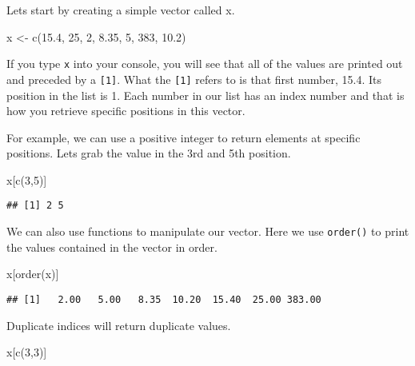 \documentclass[
]{article}
\newenvironment{Shaded}{\begin{snugshade}}{\end{snugshade}}
\newcommand{\DecValTok}[1]{\textcolor[rgb]{0.00,0.00,0.81}{#1}}
\newcommand{\FloatTok}[1]{\textcolor[rgb]{0.00,0.00,0.81}{#1}}
\newcommand{\FunctionTok}[1]{\textcolor[rgb]{0.00,0.00,0.00}{#1}}
\newcommand{\NormalTok}[1]{#1}
\newcommand{\OtherTok}[1]{\textcolor[rgb]{0.56,0.35,0.01}{#1}}
\begin{document}
Lets start by creating a simple vector called x.

\begin{Shaded}
\begin{Highlighting}[]
\NormalTok{x }\OtherTok{\textless{}{-}} \FunctionTok{c}\NormalTok{(}\FloatTok{15.4}\NormalTok{, }\DecValTok{25}\NormalTok{, }\DecValTok{2}\NormalTok{, }\FloatTok{8.35}\NormalTok{, }\DecValTok{5}\NormalTok{, }\DecValTok{383}\NormalTok{, }\FloatTok{10.2}\NormalTok{)}
\end{Highlighting}
\end{Shaded}

If you type \texttt{x} into your console, you will see that all of the
values are printed out and preceded by a \texttt{{[}1{]}}. What the
\texttt{{[}1{]}} refers to is that first number, 15.4. Its position in
the list is 1. Each number in our list has an index number and that is
how you retrieve specific positions in this vector.

For example, we can use a positive integer to return elements at
specific positions. Lets grab the value in the 3rd and 5th position.

\begin{Shaded}
\begin{Highlighting}[]
\NormalTok{x[}\FunctionTok{c}\NormalTok{(}\DecValTok{3}\NormalTok{,}\DecValTok{5}\NormalTok{)]}
\end{Highlighting}
\end{Shaded}

\begin{verbatim}
## [1] 2 5
\end{verbatim}

We can also use functions to manipulate our vector. Here we use
\texttt{order()} to print the values contained in the vector in order.

\begin{Shaded}
\begin{Highlighting}[]
\NormalTok{x[}\FunctionTok{order}\NormalTok{(x)]}
\end{Highlighting}
\end{Shaded}

\begin{verbatim}
## [1]   2.00   5.00   8.35  10.20  15.40  25.00 383.00
\end{verbatim}

Duplicate indices will return duplicate values.

\begin{Shaded}
\begin{Highlighting}[]
\NormalTok{x[}\FunctionTok{c}\NormalTok{(}\DecValTok{3}\NormalTok{,}\DecValTok{3}\NormalTok{)]}
\end{Highlighting}
\end{Shaded}
\end{document}
